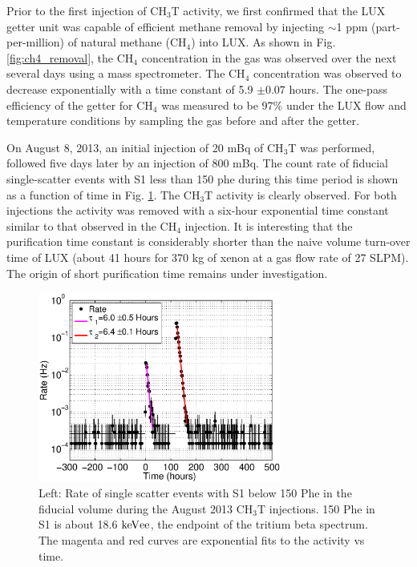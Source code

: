 Prior to the first injection of CH$_3$T activity, we first confirmed that the LUX getter unit was capable of efficient methane removal by injecting  $\sim$1 ppm (part-per-million) of natural methane (CH$_4$) into LUX. As shown in Fig. \ref{fig:ch4_removal}, the CH$_4$ concentration in the gas was observed over the next several days using a mass spectrometer. The CH$_4$ concentration was observed to decrease exponentially with a time constant of 5.9 $\pm 0.07$ hours. The one-pass efficiency of the getter for CH$_4$ was measured to be 97\% under the LUX flow and temperature conditions by sampling the gas before and after the getter. 

On August 8, 2013, an initial injection of 20 mBq of CH$_3$T was performed, followed five days later by an injection of 800 mBq.
The count rate of fiducial single-scatter events with S1 less than 150 phe during this time period is shown as a function of time in Fig. \ref{fig:ch3t_removal}. The CH$_3$T activity is clearly observed. For both injections the activity was removed with a six-hour exponential time constant similar to that observed in the CH$_4$ injection. It is interesting that the purification time constant is considerably shorter than the naive volume turn-over time of LUX (about 41 hours for 370 kg of xenon at a gas flow rate of 27 SLPM).  The origin of short purification time remains under investigation.

\begin{figure}[h!]\centering
\includegraphics[width=80mm]{fig/CH3T_Rate_fid_150_Run03_Tritium_Rate.eps}
\caption{Left: Rate of single scatter events with S1 below 150 Phe in the fiducial volume during the August 2013 CH$_3$T injections. 150 Phe in S1 is about 18.6 $\rm keV{ee}$, the endpoint of the tritium beta spectrum. The magenta and red curves are exponential fits to the activity vs time.}
\label{fig:ch3t_removal}
\end{figure}

